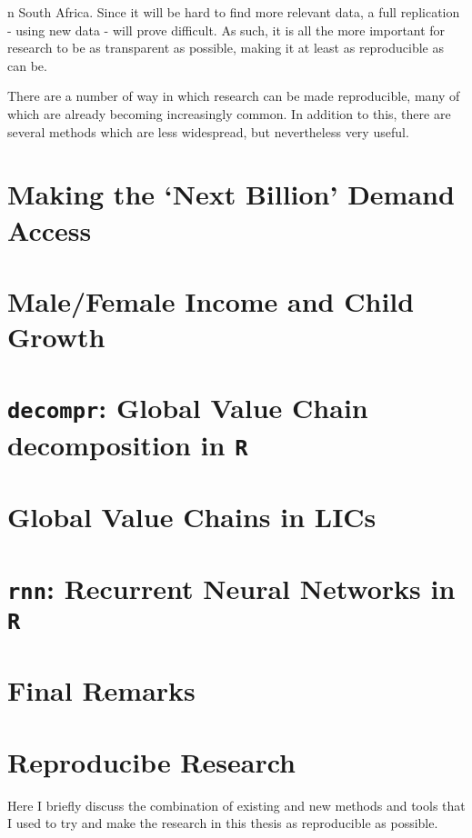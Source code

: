 \documentclass[a4paper,oneside,british]{book}\usepackage[]{graphicx}\usepackage[]{color}
\newcommand{\code}[1]{\texttt{#1}}
\begin{document}
n South Africa. Since it will be hard to find more relevant data,
a full replication - using new data - will prove difficult. As such,
it is all the more important for research to be as transparent as
possible, making it at least as reproducible as can be.

There are a number of way in which research can be made reproducible,
many of which are already becoming increasingly common. In addition
to this, there are several methods which are less widespread, but
nevertheless very useful.

\newpage{}

\chapter{Making the `Next Billion' Demand Access}

\newpage{}

\chapter{Male/Female Income and Child Growth}


\chapter{\protect\code{decompr}: Global Value Chain decomposition in \protect\code{R}}


\chapter{Global Value Chains in LICs}


\chapter{\protect\code{rnn}: Recurrent Neural Networks in \protect\code{R}}


\chapter*{Final Remarks}



\appendix

\chapter{Reproducibe Research}

Here I briefly discuss the combination of existing and new methods
and tools that I used to try and make the research in this thesis
as reproducible as possible.
\end{document}
